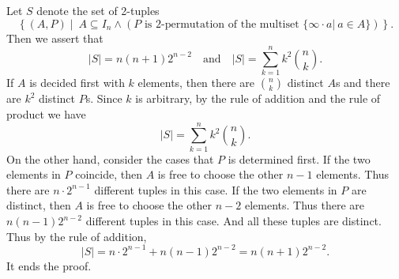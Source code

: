 \documentclass{assignment}[2019/10/15]
\newcommand{\lr}[3]{\left#1#3\right#2}
\newcommand{\lmr}[5]{\left#1#4\middle#2#5\right#3}
\begin{document}
    \begin{solution}
        Let $S$ denote the set of 2-tuples
        \begin{equation}
            \lmr\{|\}{(A, P)}{\ A\subseteq I_n \wedge \lr(){\text{$P$ is 2-permutation of the multiset $\{\infty\cdot a|\ a\in A\}$}}}.
        \end{equation}
        Then we assert that
        \begin{equation}
            |S| = n(n+1)2^{n-2} \quad\text{and}\quad |S| = \sum_{k=1}^nk^2\binom nk.
        \end{equation}
        If $A$ is decided first with $k$ elements, then there are $\binom nk$ distinct $A$s and there are $k^2$ distinct $P$s. Since $k$ is arbitrary,  by the rule of addition and the rule of product we have
        \begin{equation}
            |S| = \sum_{k=1}^nk^2\binom nk.
        \end{equation}
        On the other hand, consider the cases that $P$ is determined first. If the two elements in $P$ coincide, then $A$ is free to choose the other $n-1$ elements. Thus there are $n\cdot 2^{n-1}$ different tuples in this case. If the two elements in $P$ are distinct, then $A$ is free to choose the other $n-2$ elements. Thus there are $n(n-1) 2^{n-2}$ different tuples in this case. And all these tuples are distinct. Thus by the rule of addition,
        \begin{equation}
            |S| = n\cdot 2^{n-1} + n(n-1) 2^{n-2} = n(n+1)2^{n-2}.
        \end{equation}
        It ends the proof.
    \end{solution}
\end{document}
